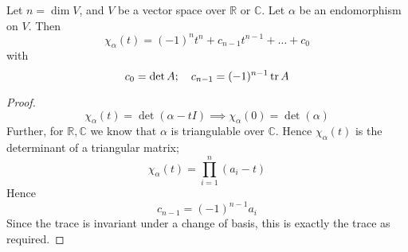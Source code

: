 \begin{lemma}
	Let \( n = \dim V \), and \( V \) be a vector space over \( \mathbb R \) or \( \mathbb C \).
	Let \( \alpha \) be an endomorphism on \( V \).
	Then
	\[
		\chi_\alpha(t) = (-1)^n t^n + c_{n-1} t^{n-1} + \dots + c_0
	\]
	with
	\[
		c_0 = \det A;\quad c_{n-1} = (-1)^{n-1} \tr A
	\]
\end{lemma}
\begin{proof}
	\[
		\chi_\alpha(t) = \det(\alpha - t I) \implies \chi_\alpha(0) = \det(\alpha)
	\]
	Further, for \( \mathbb R, \mathbb C \) we know that \( \alpha \) is triangulable over \( \mathbb C \).
	Hence \( \chi_\alpha(t) \) is the determinant of a triangular matrix;
	\[
		\chi_\alpha(t) = \prod_{i=1}^n (a_i - t)
	\]
	Hence
	\[
		c_{n-1} = (-1)^{n-1} a_i
	\]
	Since the trace is invariant under a change of basis, this is exactly the trace as required.
\end{proof}
